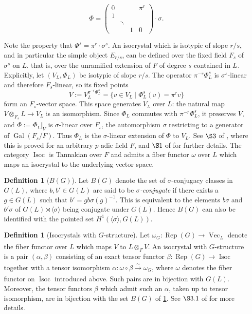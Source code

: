 \documentclass[11pt,a4paper]{article}
\theoremstyle{definition}
\newtheorem{D}[shared]{Definition}
\theoremstyle{plain}
\theoremstyle{remark}
\theoremstyle{plain}
\DeclareMathOperator{\Isoc}{Isoc}
\DeclareMathOperator{\Rep}{Rep}
\DeclareMathOperator{\Vect}{Vec}
\DeclareMathOperator{\Gal}{Gal}
\begin{document}
$$ \Phi = \begin{pmatrix}
    0 & & & \pi^r \\
    1 & & & \\
    & \ddots & & \\
    & & 1 & 0
\end{pmatrix} \cdot \sigma. $$

Note the property that $\Phi^s = \pi^r \cdot \sigma^s$. An isocrystal which is isotypic of slope $r/s$, and in particular the simple object $E_{r/s}$, can be defined over the fixed field $F_s$ of $\sigma^s$ on $L$, that is, over the unramified extension of $F$ of degree $s$ contained in $L$. Explicitly, let $(V_L, \Phi_L)$ be isotypic of slope $r/s$. The operator $\pi^{-r}\Phi_L^s$ is $\sigma^s$-linear and therefore $F_s$-linear, so its fixed points
    $$V := V_L^{\pi^{-r}\Phi_L^s} = \{v \in V_L \mid \Phi_L^s(v) = \pi^r v\}$$
    form an $F_s$-vector space. This space generates $V_L$ over $L$: the natural map $V \otimes_{F_s} L \xrightarrow[]{} V_L$ is an isomorphism. Since $\Phi_L$ commutes with $\pi^{-r}\Phi_L^s$, it preserves $V$, and $\Phi := \Phi_L|_V$ is $\sigma$-linear over $F_s$, the automorphism $\sigma$ restricting to a generator of $\Gal(F_s/F)$. Thus $\Phi_L$ is the $\sigma$-linear extension of $\Phi$ to $V_L$. See $\S 3$ of \cite{MR809866}, where this is proved for an arbitrary $p$-adic field $F$, and $\S 1$ of \cite{MR2074057} for further details. The category $\Isoc$ is Tannakian over $F$ and admits a fiber functor $\omega$ over $L$ which maps an isocrystal to the underlying vector space.

\begin{D}[$B(G)$]\label{B(G)def}
    Let $B(G)$ denote the set of $\sigma$-conjugacy classes in $G(L)$, where $b, b' \in G(L)$ are said to be \textit{$\sigma$-conjugate} if there exists a $g \in G(L)$ such that $b' = g b \sigma(g)^{-1}$. This is equivalent to the elements $b\sigma$ and $b'\sigma$ of $G(L) \rtimes \langle \sigma \rangle$ being conjugate under $G(L)$. Hence $B(G)$ can also be identified with the pointed set $H^1(\langle \sigma \rangle, G(L))$.
\end{D}

\begin{D}[Isocrystals with $G$-structure]\label{isocGstructure}
     Let $\omega_G: \Rep(G) \xrightarrow[]{} \Vect_L$ denote the fiber functor over $L$ which maps $V$ to $L \otimes_F V$. An isocrystal with $G$-structure is a pair $(\alpha, \beta)$ consisting of an exact tensor functor $\beta: \Rep(G) \xrightarrow[]{} \Isoc$ together with a tensor isomorphism $\alpha: \omega \circ \beta \xrightarrow[]{\sim} \omega_G$, where $\omega$ denotes the fiber functor on $\Isoc$ introduced above. Such pairs are in bijection with $G(L)$. Moreover, the tensor functors $\beta$ which admit such an $\alpha$, taken up to tensor isomorphism, are in bijection with the set $B(G)$ of \ref{B(G)def}. See $\S 3.1$ of \cite{MR1485921} for more details.
\end{D}
\end{document}
